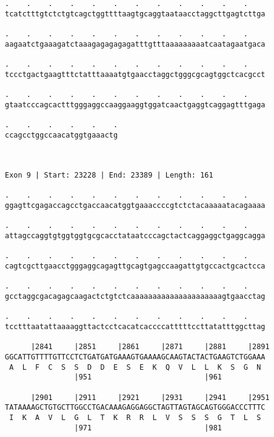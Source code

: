 \documentclass{article}
\begin{document}
\begin{Verbatim}
.    .    .    .    .    .    .    .    .    .    .    .    
tcatctttgtctctgtcagctggttttaagtgcaggtaataacctaggcttgagtcttga
                                                            
.    .    .    .    .    .    .    .    .    .    .    .    
aagaatctgaaagatctaaagagagagagatttgtttaaaaaaaaatcaatagaatgaca
                                                            
.    .    .    .    .    .    .    .    .    .    .    .    
tccctgactgaagtttctatttaaaatgtgaacctaggctgggcgcagtggctcacgcct
                                                            
.    .    .    .    .    .    .    .    .    .    .    .    
gtaatcccagcactttgggaggccaaggaaggtggatcaactgaggtcaggagtttgaga
                                                            
.    .    .    .    .    .
ccagcctggccaacatggtgaaactg
                          
                          
 
Exon 9 | Start: 23228 | End: 23389 | Length: 161
 
.    .    .    .    .    .    .    .    .    .    .    .    
ggagttcgagaccagcctgaccaacatggtgaaaccccgtctctacaaaaatacagaaaa
                                                            
.    .    .    .    .    .    .    .    .    .    .    .    
attagccaggtgtggtggtgcgcacctataatcccagctactcaggaggctgaggcagga
                                                            
.    .    .    .    .    .    .    .    .    .    .    .    
cagtcgcttgaacctgggaggcagagttgcagtgagccaagattgtgccactgcactcca
                                                            
.    .    .    .    .    .    .    .    .    .    .    .    
gcctaggcgacagagcaagactctgtctcaaaaaaaaaaaaaaaaaaaaagtgaacctag
                                                            
.    .    .    .    .    .    .    .    .    .    .    .    
tcctttaatattaaaaggttactcctcacatcaccccatttttccttatatttggcttag
                                                            
      |2841     |2851     |2861     |2871     |2881     |2891
GGCATTGTTTTGTTCCTCTGATGATGAAAGTGAAAAGCAAGTACTACTGAAGTCTGGAAA
 A  L  F  C  S  S  D  D  E  S  E  K  Q  V  L  L  K  S  G  N 
                |951                          |961          
  
      |2901     |2911     |2921     |2931     |2941     |2951
TATAAAAGCTGTGCTTGGCCTGACAAAGAGGAGGCTAGTTAGTAGCAGTGGGACCCTTTC
 I  K  A  V  L  G  L  T  K  R  R  L  V  S  S  S  G  T  L  S 
                |971                          |981          
  

\end{Verbatim}
\end{document}
